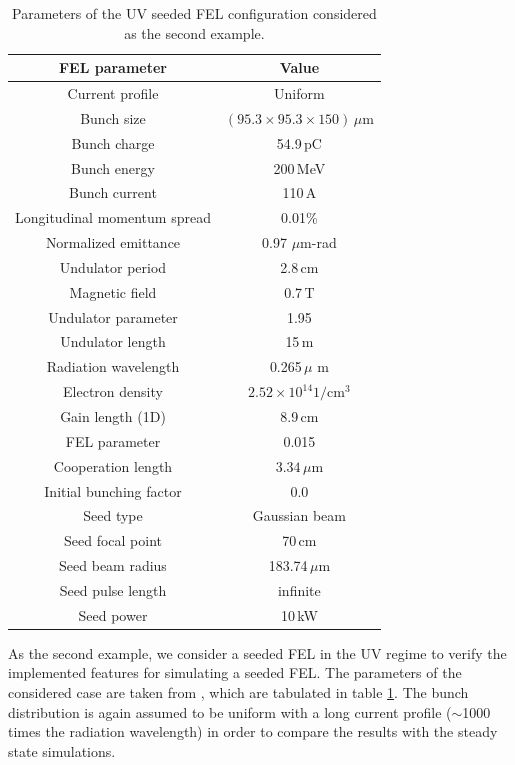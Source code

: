 \begin{table}
\label{example2}
\caption{Parameters of the UV seeded FEL configuration considered as the second example.}
\centering
\begin{tabular}{|c||c|}
\hline
FEL parameter & Value \\ \hline \hline
Current profile & Uniform \\ \hline
Bunch size & $(95.3\times95.3\times150)\,\mu$m \\ \hline
Bunch charge & 54.9\,pC \\ \hline
Bunch energy & 200\,MeV \\	\hline
Bunch current & 110\,A \\ \hline
Longitudinal momentum spread & 0.01\% \\ \hline
Normalized emittance & 0.97 $\mu$m-rad \\	\hline
Undulator period & 2.8\,cm \\ \hline
Magnetic field & 0.7\,T \\ \hline
Undulator parameter & 1.95 \\ \hline
Undulator length & 15\,m \\ \hline
Radiation wavelength & 0.265\,$\mu$ m \\ \hline
Electron density & $2.52\times10^{14} 1/\text{cm}^3$ \\ \hline
Gain length (1D) & 8.9\,cm \\ \hline
FEL parameter & 0.015 \\ \hline
Cooperation length & $3.34\,\mu$m \\ \hline
Initial bunching factor & $0.0$ \\ \hline
Seed type & Gaussian beam \\ \hline
Seed focal point & 70\,cm \\ \hline
Seed beam radius & 183.74\,$\mu$m \\ \hline
Seed pulse length & infinite \\ \hline
Seed power & 10\,kW \\ \hline
\end{tabular}
\end{table}
%
As the second example, we consider a seeded FEL in the UV regime to verify the implemented features for simulating a seeded FEL.
%
The parameters of the considered case are taken from \cite{giannessi2006overview}, which are tabulated in table \ref{example2}.
%
The bunch distribution is again assumed to be uniform with a long current profile ($\sim$1000 times the radiation wavelength) in order to compare the results with the steady state simulations.
